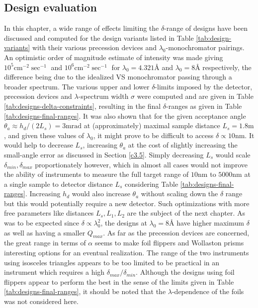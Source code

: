 \documentclass{article}
\begin{document}
\subsection{Design evaluation}
In this chapter, a wide range of effects limiting the $\delta$-range of designs have been discussed and computed for the design variants listed in Table \ref{tab:design-variants} with their various precession devices and $\lambda_0$-monochromator pairings. An optimistic order of magnitude estimate of intensity was made giving $10^5 \unit{\centi\meter^{-2}\sec^{-1}}$ and $10^6 \unit{\centi\meter^{-2}\sec^{-1}}$ for $\lambda_0 = 4.321$Å and $\lambda_0 = 8$Å respectively, the difference being due to the idealized VS monochromator passing through a broader spectrum. The various upper and lower $\delta$-limits imposed by the detector, precession devices and $\lambda$-spectrum width $\sigma$ were computed and are given in Table \ref{tab:designs-delta-constraints}, resulting in the final $\delta$-ranges as given in Table \ref{tab:designs-final-ranges}. It was also shown that for the given acceptance angle $\theta_a \approx h_d / (2L_s) = 3\unit{\milli\radian}$ at (approximately) maximal sample distance $L_s = 1.8\unit\meter$, and given these values of $\lambda_0$, it might prove to be difficult to access $\delta\propto 10\unit{\nano\meter}$. It would help to decrease $L_s$, increasing $\theta_a$ at the cost of slightly increasing the small-angle error as discussed in Section \ref{c3.5}. Simply decreasing $L_s$ would scale $\delta_{min}, \delta_{max}$ proportionately however, which in almost all cases would not improve the ability of instruments to measure the full target range of $10 \unit{\nano\meter}$ to $5000 \unit{\nano\meter}$ at a single sample to detector distance $L_s$ considering Table \ref{tab:designs-final-ranges}. Increasing $h_d$ would also increase $\theta_a$ without scaling down the $\delta$ range but this would potentially require a new detector. Such optimizations with more free parameters like distances $L_s, L_1, L_2$ are the subject of the next chapter. As was to be expected since $\delta \propto \lambda_0^2$, the designs at $\lambda_0 = 8$Å have higher maximum $\delta$ as well as having a smaller $Q_{max}$. As far as the precession devices are concerned, the great range in terms of $\alpha$ seems to make foil flippers and Wollaston prisms interesting options for an eventual realization. The range of the two instruments using isosceles triangles appears to be too limited to be practical in an instrument which requires a high $\delta_{max}/\delta_{min}$. Although the designs using foil flippers appear to perform the best in the sense of the limits given in Table \ref{tab:designs-final-ranges}, it should be noted that the $\lambda$-dependence \cite{kraan2003} of the foils was not considered here.
\end{document}
